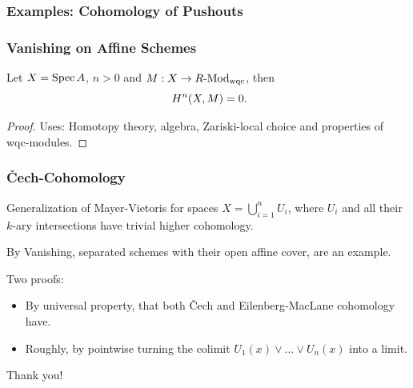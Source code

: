 \documentclass{beamer}
\begin{document}
\begin{frame}
  \frametitle{Examples: Cohomology of Pushouts}

  \vspace{1.5cm}
  \pause

\end{frame}

\begin{frame}
  \frametitle{Vanishing on Affine Schemes}
  \begin{theorem}
    Let $X=\operatorname{Spec} A$, $n>0$ and $M:X\to R\text{-}\mathrm{Mod}_{\mathrm{wqc}}$, then
    \[
      H^n(X,M)=0
      \rlap{.}
    \]
  \end{theorem}
  \pause
  \begin{proof}
    Uses: Homotopy theory, algebra, Zariski-local choice and properties of wqc-modules.
  \end{proof}
\end{frame}

\begin{frame}
  \frametitle{\v{C}ech-Cohomology}
  Generalization of Mayer-Vietoris for spaces $X=\bigcup_{i=1}^nU_i$, where $U_i$ and all their $k$-ary intersections have trivial higher cohomology.
  
  \pause
  By Vanishing, separated schemes with their open affine cover, are an example.
  
  \pause
  Two proofs:
  \begin{itemize}
  \item By universal property, that both \v{C}ech and Eilenberg-MacLane cohomology have.
  \item Roughly, by pointwise turning the colimit $U_1(x)\vee\dots\vee U_n(x)$ into a limit.
  \end{itemize}
\end{frame}

\begin{frame}
  \centering
  Thank you!
\end{frame}
\end{document}
